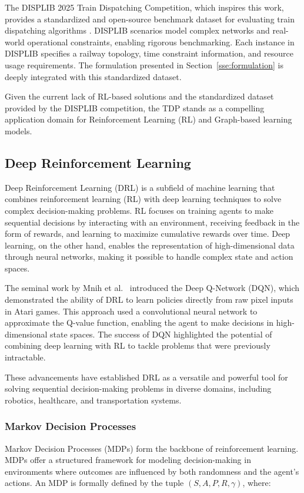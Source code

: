 \documentclass[runningheads]{llncs}
\begin{document}
The DISPLIB 2025 Train Dispatching Competition, which inspires this work, provides a standardized and open-source benchmark dataset for evaluating train dispatching algorithms \cite{train:DISPLIB2025}. 
DISPLIB scenarios model complex networks and real-world operational constraints, enabling rigorous benchmarking. 
Each instance in DISPLIB specifies a railway topology, time constraint information, and resource usage requirements. 
The formulation presented in Section~\ref{sse:formulation} is deeply integrated with this standardized dataset.

Given the current lack of RL-based solutions and the standardized dataset provided by the DISPLIB competition, the TDP stands as a compelling application domain for Reinforcement Learning (RL) and Graph-based learning models.

\subsection{Deep Reinforcement Learning}
\label{sss:reinforcement_learning}
Deep Reinforcement Learning (DRL) is a subfield of machine learning that combines reinforcement learning (RL) with deep learning techniques to solve complex decision-making problems. 
RL focuses on training agents to make sequential decisions by interacting with an environment, receiving feedback in the form of rewards, and learning to maximize cumulative rewards over time. 
Deep learning, on the other hand, enables the representation of high-dimensional data through neural networks, making it possible to handle complex state and action spaces.

The seminal work by Mnih et al.~\cite{drl:Mnih13} introduced the Deep Q-Network (DQN), which demonstrated the ability of DRL to learn policies directly from raw pixel inputs in Atari games. 
This approach used a convolutional neural network to approximate the Q-value function, enabling the agent to make decisions in high-dimensional state spaces. 
The success of DQN highlighted the potential of combining deep learning with RL to tackle problems that were previously intractable.

These advancements have established DRL as a versatile and powerful tool for solving sequential decision-making problems in diverse domains, including robotics, healthcare, and transportation systems.
\subsubsection{Markov Decision Processes}
Markov Decision Processes (MDPs) form the backbone of reinforcement learning. 
MDPs offer a structured framework for modeling decision-making in environments where outcomes are influenced by both randomness and the agent's actions. 
An MDP is formally defined by the tuple $(S, A, P, R, \gamma)$, where:
\end{document}
